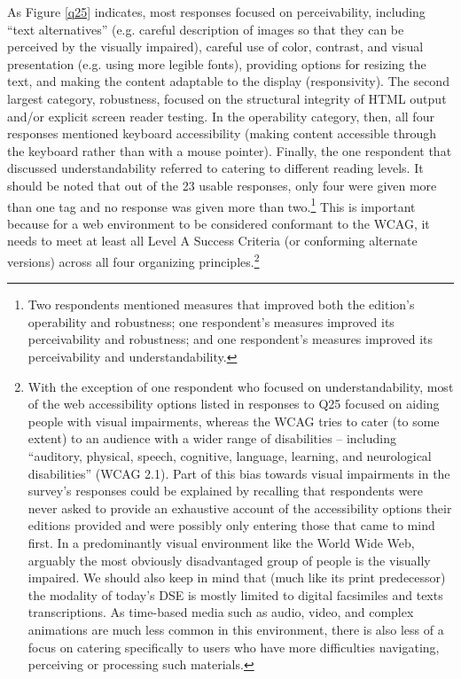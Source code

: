 \begin{paper}
As Figure \ref{q25} indicates, most responses focused on perceivability,
including ``text alternatives'' (e.g. careful description of images so
that they can be perceived by the visually impaired), careful use of
color, contrast, and visual presentation (e.g. using more legible
fonts), providing options for resizing the text, and making the content
adaptable to the display (responsivity). The second largest category,
robustness, focused on the structural integrity of HTML output and/or
explicit screen reader testing. In the operability category, then, all
four responses mentioned keyboard accessibility (making content
accessible through the keyboard rather than with a mouse pointer).
Finally, the one respondent that discussed understandability referred to
catering to different reading levels. It should be noted that out of the
23 usable responses, only four were given more than one tag and no
response was given more than two.\footnote{Two respondents mentioned
  measures that improved both the edition's operability and robustness;
  one respondent's measures improved its perceivability and robustness;
  and one respondent's measures improved its perceivability and
  understandability.} This is important because for a web environment to
be considered conformant to the WCAG, it needs to meet at least all
Level A Success Criteria (or conforming alternate versions) across all
four organizing principles.\footnote{With the exception of one
  respondent who focused on understandability, most of the web
  accessibility options listed in responses to Q25 focused on aiding
  people with visual impairments, whereas the WCAG tries to cater (to
  some extent) to an audience with a wider range of disabilities --
  including ``auditory, physical, speech, cognitive, language, learning,
  and neurological disabilities'' (WCAG 2.1). Part of this bias towards
  visual impairments in the survey's responses could be explained by
  recalling that respondents were never asked to provide an exhaustive
  account of the accessibility options their editions provided and were
  possibly only entering those that came to mind first. In a
  predominantly visual environment like the World Wide Web, arguably the
  most obviously disadvantaged group of people is the visually impaired.
  We should also keep in mind that (much like its print predecessor) the
  modality of today's DSE is mostly limited to digital facsimiles and
  texts transcriptions. As time-based media such as audio, video, and
  complex animations are much less common in this environment, there is
  also less of a focus on catering specifically to users who have more
  difficulties navigating, perceiving or processing such materials.}


\end{paper}
